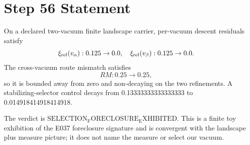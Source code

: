 \documentclass[11pt]{article}
\begin{document}
\section*{Step 56 Statement}
On a declared two-vacuum finite landscape carrier, per-vacuum descent residuals satisfy
\[
  \xi_{\rm rel}(v_\alpha): 0.125 \to 0.0,
  \quad
  \xi_{\rm rel}(v_\beta): 0.125 \to 0.0.
\]
The cross-vacuum route mismatch satisfies
\[
  RM: 0.25 \to 0.25,
\]
so it is bounded away from zero and non-decaying on the two refinements. A stabilizing-selector control decays from
0.13333333333333333 to 0.014918414918414918.

The verdict is \(\mathrm{SELECTION_FORECLOSURE_EXHIBITED}\). This is a finite toy exhibition of the E037 foreclosure signature and is convergent with the landscape plus measure picture; it does not name the measure or select our vacuum.
\end{document}
